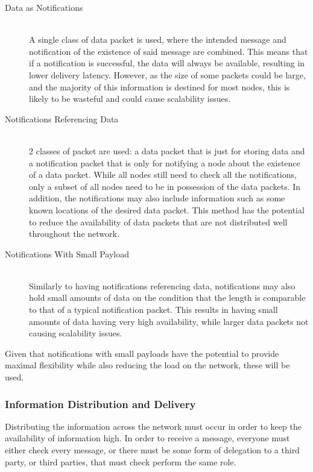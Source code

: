 			\begin{description}
				\item[Data as Notifications] \hfill \\
				A single class of data packet is used, where the intended message and notification of the existence of said message are combined. This means that if a notification is successful, the data will always be available, resulting in lower delivery latency. However, as the size of some packets could be large, and the majority of this information is destined for most nodes, this is likely to be wasteful and could cause scalability issues.
				\item[Notifications Referencing Data] \hfill \\
				2 classes of packet are used: a data packet that is just for storing data and a notification packet that is only for notifying a node about the existence of a data packet. While all nodes still need to check all the notifications, only a subset of all nodes need to be in possession of the data packets. In addition, the notifications may also include information such as some known locations of the desired data packet. This method has the potential to reduce the availability of data packets that are not distributed well throughout the network.
				\item[Notifications With Small Payload] \hfill \\
				Similarly to having notifications referencing data, notifications may also hold small amounts of data on the condition that the length is comparable to that of a typical notification packet. This results in having small amounts of data having very high availability, while larger data packets not causing scalability issues.
			\end{description}
			
			
			Given that notifications with small payloads have the potential to provide maximal flexibility while also reducing the load on the network, these will be used.
			
		\subsubsection{Information Distribution and Delivery}
			Distributing the information across the network must occur in order to keep the availability of information high. In order to receive a message, everyone must either check every message, or there must be some form of delegation to a third party, or third parties, that must check perform the same role.
			
